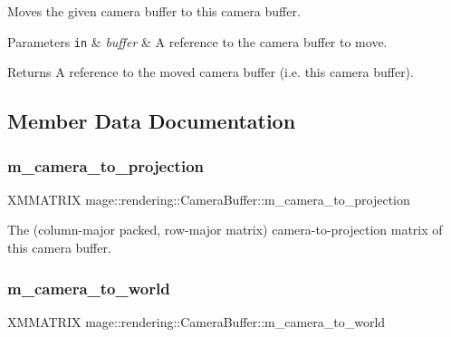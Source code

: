 Moves the given camera buffer to this camera buffer.


\begin{DoxyParams}[1]{Parameters}
\mbox{\tt in}  & {\em buffer} & A reference to the camera buffer to move. \\
\hline
\end{DoxyParams}
\begin{DoxyReturn}{Returns}
A reference to the moved camera buffer (i.\+e. this camera buffer). 
\end{DoxyReturn}


\subsection{Member Data Documentation}
\hypertarget{structmage_1_1rendering_1_1_camera_buffer_a75669aa0916514b1d414e5a2f7c72c75}{}\label{structmage_1_1rendering_1_1_camera_buffer_a75669aa0916514b1d414e5a2f7c72c75} 
\subsubsection{\texorpdfstring{m\+\_\+camera\+\_\+to\+\_\+projection}{m\_camera\_to\_projection}}
{\footnotesize\ttfamily X\+M\+M\+A\+T\+R\+IX mage\+::rendering\+::\+Camera\+Buffer\+::m\+\_\+camera\+\_\+to\+\_\+projection}

The (column-\/major packed, row-\/major matrix) camera-\/to-\/projection matrix of this camera buffer. \hypertarget{structmage_1_1rendering_1_1_camera_buffer_a0633cfc689f2a097783ecc1626b94590}{}\label{structmage_1_1rendering_1_1_camera_buffer_a0633cfc689f2a097783ecc1626b94590} 
\subsubsection{\texorpdfstring{m\+\_\+camera\+\_\+to\+\_\+world}{m\_camera\_to\_world}}
{\footnotesize\ttfamily X\+M\+M\+A\+T\+R\+IX mage\+::rendering\+::\+Camera\+Buffer\+::m\+\_\+camera\+\_\+to\+\_\+world}


